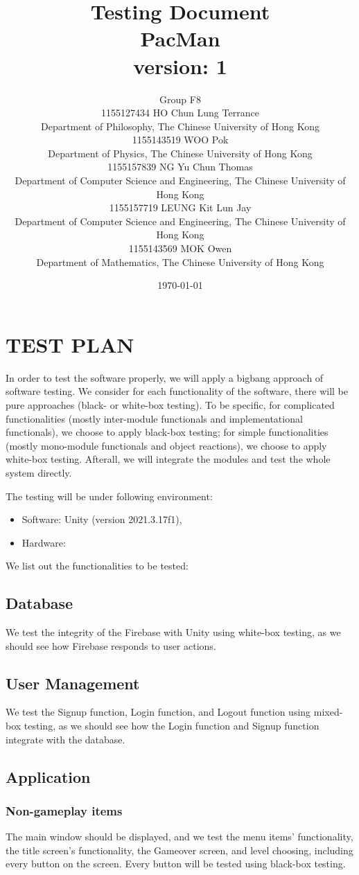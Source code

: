 \documentclass[11pt]{article}
\title{Testing Document\\PacMan\\version: 1}
\author{Group F8\\1155127434 HO Chun Lung Terrance\\
Department of Philosophy, The Chinese University of Hong Kong\\1155143519 WOO Pok\\
Department of Physics, The Chinese University of Hong Kong\\1155157839 NG Yu Chun Thomas\\
Department of Computer Science and Engineering, The Chinese University of Hong Kong\\1155157719 LEUNG Kit Lun Jay\\
Department of Computer Science and Engineering, The Chinese University of Hong Kong\\1155143569 MOK Owen\\
Department of Mathematics, The Chinese University of Hong Kong}
\date{\today}
\begin{document}
    \maketitle
    \tableofcontents
    \newpage

    \section{TEST PLAN}
    In order to test the software properly, we will apply a bigbang approach of software testing. We consider for each functionality of the software, there will be pure approaches (black- or white-box testing). To be specific, for complicated functionalities (mostly inter-module functionals and implementational functionals), we choose to apply black-box testing; for simple functionalities (mostly mono-module functionals and object reactions), we choose to apply white-box testing. Afterall, we will integrate the modules and test the whole system directly.

    The testing will be under following environment:
    \begin{itemize}
        \item Software: Unity (version 2021.3.17f1),
        \item Hardware: 
    \end{itemize}

    We list out the functionalities to be tested:

    \subsection*{Database}
    We test the integrity of the Firebase with Unity using white-box testing, as we should see how Firebase responds to user actions.

    \subsection*{User Management}
    We test the Signup function, Login function, and Logout function using mixed-box testing, as we should see how the Login function and Signup function integrate with the database.

    \subsection*{Application}
    \subsubsection*{Non-gameplay items}
    The main window should be displayed, and we test the menu items' functionality, the title screen's functionality, the Gameover screen, and level choosing, including every button on the screen. Every button will be tested using black-box testing.
\end{document}
